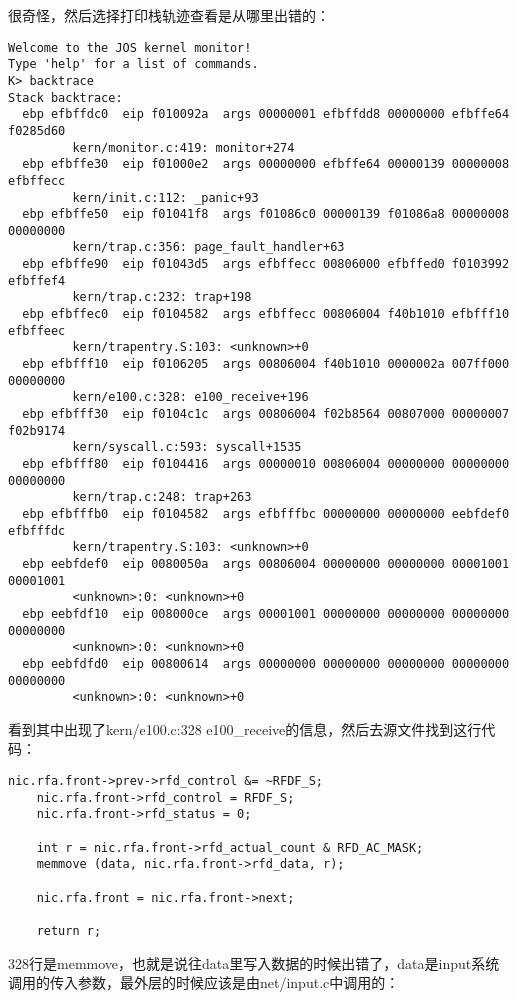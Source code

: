 \documentclass{article}
\begin{document}
\begin{CJK*}{UTF8}{gkai}
很奇怪，然后选择打印栈轨迹查看是从哪里出错的：

\begin{lstlisting}[style=console]
Welcome to the JOS kernel monitor!
Type 'help' for a list of commands.
K> backtrace
Stack backtrace:
  ebp efbffdc0  eip f010092a  args 00000001 efbffdd8 00000000 efbffe64 f0285d60
         kern/monitor.c:419: monitor+274
  ebp efbffe30  eip f01000e2  args 00000000 efbffe64 00000139 00000008 efbffecc
         kern/init.c:112: _panic+93
  ebp efbffe50  eip f01041f8  args f01086c0 00000139 f01086a8 00000008 00000000
         kern/trap.c:356: page_fault_handler+63
  ebp efbffe90  eip f01043d5  args efbffecc 00806000 efbffed0 f0103992 efbffef4
         kern/trap.c:232: trap+198
  ebp efbffec0  eip f0104582  args efbffecc 00806004 f40b1010 efbfff10 efbffeec
         kern/trapentry.S:103: <unknown>+0
  ebp efbfff10  eip f0106205  args 00806004 f40b1010 0000002a 007ff000 00000000
         kern/e100.c:328: e100_receive+196
  ebp efbfff30  eip f0104c1c  args 00806004 f02b8564 00807000 00000007 f02b9174
         kern/syscall.c:593: syscall+1535
  ebp efbfff80  eip f0104416  args 00000010 00806004 00000000 00000000 00000000
         kern/trap.c:248: trap+263
  ebp efbfffb0  eip f0104582  args efbfffbc 00000000 00000000 eebfdef0 efbfffdc
         kern/trapentry.S:103: <unknown>+0
  ebp eebfdef0  eip 0080050a  args 00806004 00000000 00000000 00001001 00001001
         <unknown>:0: <unknown>+0
  ebp eebfdf10  eip 008000ce  args 00001001 00000000 00000000 00000000 00000000
         <unknown>:0: <unknown>+0
  ebp eebfdfd0  eip 00800614  args 00000000 00000000 00000000 00000000 00000000
         <unknown>:0: <unknown>+0
\end{lstlisting}

看到其中出现了kern/e100.c:328 e100\_receive的信息，然后去源文件找到这行代码：

\begin{lstlisting}[style=ccode, firstnumber=323, title={\scriptsize \ttfamily \bfseries kern/e100.c: e100\_receive()}]
    nic.rfa.front->prev->rfd_control &= ~RFDF_S;
    nic.rfa.front->rfd_control = RFDF_S;
    nic.rfa.front->rfd_status = 0;

    int r = nic.rfa.front->rfd_actual_count & RFD_AC_MASK;
    memmove (data, nic.rfa.front->rfd_data, r);

    nic.rfa.front = nic.rfa.front->next;

    return r;
\end{lstlisting}

328行是memmove，也就是说往data里写入数据的时候出错了，data是input系统调用的传入参数，最外层的时候应该是由net/input.c中调用的：



\end{CJK*}
\end{document}
